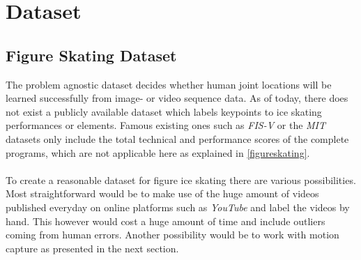 

\chapter{Dataset} %

\label{dataset} %



\section{Figure Skating Dataset}

The problem agnostic dataset decides whether human joint locations
will be learned successfully from image- or video sequence data.
As of today, there does not exist a publicly available dataset which labels keypoints to ice skating performances or
elements.
Famous existing ones such as \textit{FIS-V} or the \textit{MIT} datasets only include the total technical and performance scores of the
complete programs, which are not applicable here as explained in \autoref{figureskating}.
\\\mbox{}\\
To create a reasonable dataset for figure ice skating there are various possibilities.
Most straightforward would be to make use of the huge amount of videos published everyday on online platforms such as
\textit{YouTube} and label the videos by hand. This however would cost a huge amount of time and include outliers coming from
human errors.
Another possibility would be to work with motion capture as presented in the next section.


